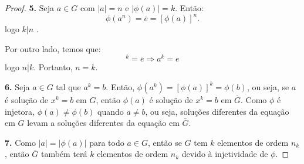 \begin{proof}
		\par\vspace{0.4cm}
		\textbf{5.} Seja $a\in G$ com $|a| = n$ e $|\phi(a)| = k$. Então:
		\begin{equation*}
		\phi(a^n) = \overline{e} = [\phi(a)]^n.
		\end{equation*}
		logo $k|n$
		.	\par Por outro lado, temos que:
		\begin{equation*}
		[\phi(a)]^k = \overline{e} \Rightarrow a^k = e
		\end{equation*}
		logo $n|k$. Portanto, $n = k$.
		\par\vspace{0.4cm}
		\textbf{6.} Seja $a \in G$ tal que $a^k = b$. Então, $\phi(a^k) = [\phi(a)]^k = \phi(b)$, ou seja, se $a$ é solução de $x^k = b$ em $G$, então $\phi(a)$ é solução de $x^k = b$ em $\overline{G}$. Como $\phi$ é injetora, $\phi(a)\neq\phi(b)$ quando $a\neq b$, ou seja, soluções diferentes da equação em $G$ levam a soluções diferentes da equação em $\overline{G}$. 
		\par\vspace{0.4cm}
		\textbf{7.} Como $|a| = |\phi(a)|$ para todo $a\in G$, então se $G$ tem $k$ elementos de ordem $n_k$, então $\overline{G}$ também terá $k$ elementos de ordem $n_k$ devido à injetividade de $\phi$.	
		
	\end{proof}  
	\par\vspace{0.3cm}
	
